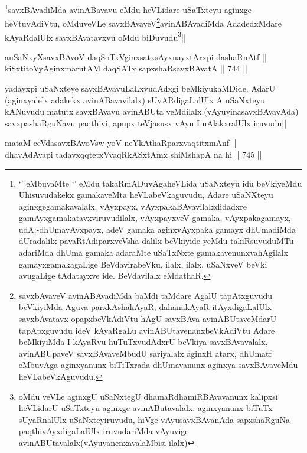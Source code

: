 \begin{artha}
\footnote{`\stext' eMbuvaMte `\stext' eMdu takaRmADuvAgaheVLida uSaNxteyu idu beVkiyeMdu Uhisuvudakekx gamakaveMta heVLabeVkaguvudu, Adare uSaNXteyu aginxgegamakavalalx, vAyxpayx, vAyxpakaBAvavilalxdidadxre gamAyxgamakatavxviruvudilalx, vAyxpayxveV gamaka, vAyxpakagamayx, udA:-dhUmavAyxpayx, adeV gamaka aginxvAyxpaka gamayx dhUmadiMda dUradalilx pavaRtAdiparxveVsha dalilx beVkiyide yeMdu takiRsuvuduMTu adariMda dhUma gamaka adaraMte uSaTxNxte gamakavenunxvahAgilalx gamayxgamakagaLige BeVdavirabeVku, ilalx, ilalx, uSaNxveV beVki avugaLige tAdatayxve ide. BeVdavilalx eMdathaR.}savxBAvadiMda avinABavavu eMdu heVLidare uSaTxteyu aginxge heVtuvAdiVtu, oMduveVLe savxBAvaveV\footnote{savxbAvaveV avinABAvadiMda baMdi taMdare AgalU tapAtxguvudu beVkiyiMda Aguva parxkAshakAyaR, dahanakAyaR itAyxdigaLalUlx savxbAvatavx opapxbeVkAdiVtu hAgU savxBAva avinABUtaveMdarU tapApxguvudu ideV kAyaRgaLu avinABUtavenanxbeVkAdiVtu Adare beMkiyiMda I kAyaRvu huTuTxvudAdxrU beVkiya savxBAvavalalx, avinABUpaveV savxBAvaveMbudU sariyalalx aginxH atarx, dhUmatf' eMbuvAga aginxyanunx biTiTxrada dhUmavanunx aginxya savxBAvaveMdu heVLabeVkAguvudu.}avinABAvadiMda AdadedxMdare kAyaRdalUlx savxBAvatavxvu oMdu biDuvudu\footnote{oMdu veVLe aginxgU uSaNxtegU dhamaRdhamiRBAvavanunx kalipxsi heVLidarU uSaTxteyu aginxge avinAButavalalx. aginxyanunx biTuTx sUyaRnalUlx uSaNxteyiruvudu, hiVge vAyusavxBAvanAda sapxshaRguNa paqthivAyxdigaLalUlx iruvudariMda vAyuvige avinABUtavalalx(vAyuvanenxavalaMbisi ilalx)}||
\end{artha}


\begin{shl}
auSaNxyXsavxBAvoV daqSoTxV\s ginxsatxsAyxnayxtArx\s pi dashaRnAtf || \\
kiSxtitoVyAginxmarutAM daqSATx sapxshaRsavxBAvatA ||  744 ||  
\end{shl}

\begin{artha}
yadayxpi uSaNxteye savxBAvavuLaLxvudAdxgi beMkiyukaMDide. AdarU (aginxyalelx adakekx avinABavavilalx) sUyARdigaLalUlx A uSaNxteyu kANuvudu matutx savxBAvavu avinABUta veMdilalx.(vAyuvinasavxBAvavAda) savxpashaRguNavu paqthivi, apupx teVjasusx vAyu I nAlakxralUlx iruvudu||
\end{artha}


\begin{shl}
mataM ceVdasavxBAvoV\s sw yoV neYkAthaRparxvaqtitxmAnf || \\
dhavAdAvapi tadavxqqtetxVvaqRkASxtAmx shiMshapA na hi ||  745 ||  
\end{shl}

